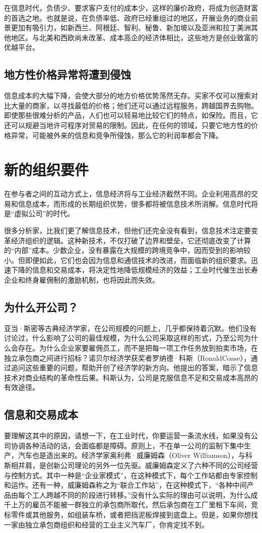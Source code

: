 在信息时代，负债少、要求客户支付的成本少，这样的廉价政府，将成为创造财富的首选之地。也就是说，在负债率低、政府已经重组过的地区，开展业务的商业前景更加有吸引力，如新西兰、阿根廷、智利、秘鲁、新加坡以及亚洲和拉丁美洲其他地区。与北美和西欧尚未改革、成本高企的经济体相比，这些地方是创业致富的优越平台。

\subsection{地方性价格异常将遭到侵蚀}
信息成本的大幅下降，会使大部分的地方价格优势荡然无存。买家不仅可以搜索对比大量的商家，以寻找最低的价格；他们还可以通过远程服务，跨越国界去购物。即使那些很难分析的产品，人们也可以轻易地比较它们的特点，如保险。而且，它还可以规避当地许可程序对贸易的限制。因此，在任何的领域，只要它地方性的价格异常，可能被外来的信息和竞争所侵蚀，那么它的利润率都会下降。

\section{新的组织要件}
在参与者之间的互动方式上，信息经济将与工业经济截然不同。企业利用高昂的交易和信息成本，而形成的长期组织优势，很多都将被信息技术所消解。信息时代将是“虚拟公司”的时代。

很多分析家，比我们更了解信息技术，但他们还完全没有看到，信息技术注定要变革经济组织的逻辑。这种新技术，不仅打破了边界和壁垒，它还彻底改变了计算的“内部”成本。少数企业，没有暴露在大规模的跨境竞争中，因而受到的影响较小。但即便如此，它们也会因为信息和通信技术的改进，而面临新的组织要求。迅速下降的信息和交易成本，将决定性地降低规模经济的效益；工业时代催生出长寿企业和终身雇佣制的激励机制，也将因此而失效。

\subsection{为什么开公司？}
亚当·斯密等古典经济学家，在公司规模的问题上，几乎都保持着沉默。他们没有讨论过，什么影响了公司的最佳规模，为什么公司采取这样的形式，乃至公司为什么会存在。为什么企业家要雇佣员工，而不是把每一项工作任务放到拍卖市场，在独立承包商之间进行招标？诺贝尔经济学获奖者罗纳德·科斯（RonaldCoase），通过追问这些重要的问题，帮助开创了经济学的新方向。他提出的答案，暗示了信息技术对商业结构的革命性后果。科斯认为，公司是克服信息不足和交易成本高昂的有效途径。

\subsection{信息和交易成本}
要理解这其中的原因，请想一下，在工业时代，你要运营一条流水线，如果没有公司协调各种活动的话，会面临都是障碍。原则上，不在单一公司的监制下集中生产，汽车也是造出来的。经济学家奥利弗·威廉姆森（Oliver Williamson），与科斯相并肩，是创新公司理论的另外一位先驱。威廉姆森定义了六种不同的公司经营与控制方式。其中一种是“企业家模式”，在这种模式下，每个工作站都由专家控制和运作。还有一种，威廉姆森称之为“联合工作站”，在这种模式下，“各种中间产品由每个工人跨越不同的阶段进行转移。”没有什么实际的理由可以说明，为什么成千上万的雇员不能被一群独立的承包商所取代，然后承包商在工厂里租下车间，竞标零件或其他服务，如组装车桥，或者把挡泥板焊接到底盘上。但是，如果你想找一家由独立承包商组织和经营的工业主义汽车厂，你肯定找不到。

